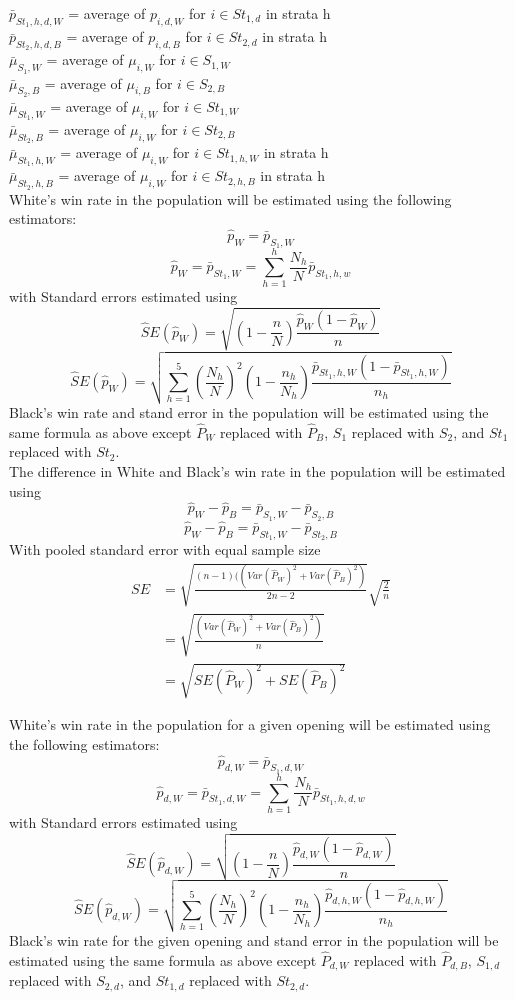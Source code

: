 \documentclass[11pt,]{article}
\begin{document}
\(\bar p_{St_1,h,d,W}\) = average of \(p_{i,d,W}\) for
\(i \in St_{1,d}\) in strata h\\
\(\bar p_{St_2,h,d,B}\) = average of \(p_{i,d,B}\) for
\(i \in St_{2,d}\) in strata h\\
\(\bar \mu_{S_1, W}\) = average of \(\mu_{i,W}\) for \(i \in S_{1,W}\)\\
\(\bar \mu_{S_2, B}\) = average of \(\mu_{i,B}\) for \(i \in S_{2,B}\)\\
\(\bar \mu_{St_1, W}\) = average of \(\mu_{i,W}\) for
\(i \in St_{1,W}\)\\
\(\bar \mu_{St_2, B}\) = average of \(\mu_{i,W}\) for
\(i \in St_{2,B}\)\\
\(\bar \mu_{St_1, h,W}\) = average of \(\mu_{i,W}\) for
\(i \in St_{1,h,W}\) in strata h\\
\(\bar \mu_{St_2, h,B}\) = average of \(\mu_{i,W}\) for
\(i \in St_{2,h,B}\) in strata h\\
\newline White's win rate in the population will be estimated using the
following estimators: \[\hat p_{W} = \bar p_{S_1,W}\]
\[\hat p_{W} = \bar p_{St_1,W} = \sum_{h=1}^{h}\frac{N_h}{N}\bar p_{St_1,h,w}\]
with Standard errors estimated using
\[\hat SE(\hat p_{W}) = \sqrt{(1-\frac{n}{N})\frac{\hat p_{W}(1-\hat p_{W})}{n}}\]
\[\hat SE(\hat p_{W}) = \sqrt{\sum_{h=1}^{5}(\frac{N_h}{N})^2(1-\frac{n_h}{N_h})\frac{\bar p_{St_1,h,W}(1-\bar p_{St_1,h,W})}{n_h}}\]
Black's win rate and stand error in the population will be estimated
using the same formula as above except \(\hat P_{W}\) replaced with
\(\hat P_{B}\), \(S_1\) replaced with \(S_2\), and \(St_1\) replaced
with \(St_2\).\\
\newline The difference in White and Black's win rate in the population
will be estimated using
\[\hat p_{W} - \hat p_{B} = \bar p_{S_1,W} - \bar p_{S_2,B}\]
\[\hat p_{W} - \hat p_{B} = \bar p_{St_1,W} - \bar p_{St_2,B}\] With
pooled standard error with equal sample size \begin{align*}
SE &= \sqrt{\frac{(n-1)((Var(\hat P_W)^2 + Var(\hat P_B)^2)}{2n-2}}\sqrt{\frac{2}{n}}\\
&=\sqrt{\frac{(Var(\hat P_W)^2 + Var(\hat P_B)^2)}{n}}\\
&= \sqrt{SE(\hat P_W)^2 + SE(\hat P_B)^2}
\end{align*} \newline

White's win rate in the population for a given opening will be estimated
using the following estimators: \[\hat p_{d, W} = \bar p_{S_1,d,W} \]
\[\hat p_{d,W} = \bar p_{St_1,d,W} = \sum_{h=1}^{h}\frac{N_h}{N}\bar p_{St_1,h,d,w}\]
with Standard errors estimated using
\[\hat SE(\hat p_{d, W}) = \sqrt{(1-\frac{n}{N})\frac{\hat p_{d, W}(1-\hat p_{d, W})}{n}}\]
\[\hat SE(\hat p_{d, W}) = \sqrt{\sum_{h=1}^{5}(\frac{N_h}{N})^2(1-\frac{n_h}{N_h})\frac{\hat p_{d,h,W}(1-\hat p_{d,h,W})}{n_{h}}}\]
Black's win rate for the given opening and stand error in the population
will be estimated using the same formula as above except
\(\hat P_{d,W}\) replaced with \(\hat P_{d,B}\), \(S_{1,d}\) replaced
with \(S_{2,d}\), and \(St_{1,d}\) replaced with \(St_{2,d}\).
\end{document}
